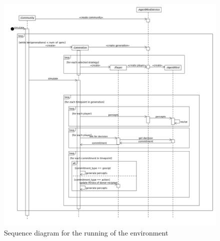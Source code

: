 \documentclass[twoside,twocolumn]{article}
\begin{document}
{}



\clearpage
\begin{figure}
	\includegraphics[width=1\textwidth]{EnvSequence.png}
	\caption{Sequence diagram for the running of the environment}
	\label{fig:env_class}
\end{figure}
\end{document}
